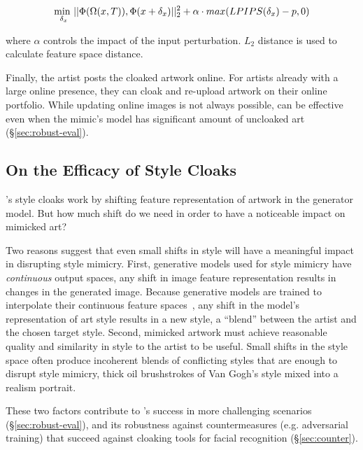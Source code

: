 \vspace{-0.05in}
\begin{equation} \label{eq:optdetail} \vspace{-0.03in} 
 \underset{\delta_x}{\text{min }}||\Phi(\Omega(x, T)), \Phi(x + \delta_x) ||_2^2 + \alpha \cdot max(LPIPS(\delta_x)-p, 0) 
\end{equation}

\noindent where $\alpha$ controls the impact of the input perturbation. $L_2$
distance is used to calculate feature space distance.

 Finally, the artist posts the cloaked artwork
online. For artists already with a large online presence, they can cloak and
re-upload artwork on their online portfolio.
While updating online images is not always possible, 
\system{} can be effective even when the mimic's model has significant amount
of uncloaked art (\S\ref{sec:robust-eval}).

\secspace
\subsection{On the Efficacy of Style Cloaks}
\label{sec:cloak-effect}

\system's style cloaks work by shifting feature representation of artwork in
the generator model. But how much shift do we need in order to have a
noticeable impact on mimicked art?


Two reasons suggest that even small shifts in style will have a meaningful
impact in disrupting style mimicry. First, generative models used for style
mimicry have {\em continuous} output spaces, \ie any shift in image feature
representation results in changes in the generated image.  Because generative
models are trained to interpolate their continuous feature
spaces~\cite{white2016sampling,upchurch2017deep}, any shift in the model's
representation of art style results in a new style, a ``blend'' between the
artist and the chosen target style.  
Second, mimicked artwork must achieve reasonable quality and similarity in
style to the artist to be useful. Small shifts in the style space often
produce incoherent blends of conflicting styles that are enough to disrupt
style mimicry, \eg thick oil brushstrokes of Van Gogh's style mixed into a realism portrait.

These two factors contribute to \system{}'s success in more challenging
scenarios (\S\ref{sec:robust-eval}), and its robustness against
countermeasures (e.g. adversarial training) that succeed against cloaking
tools for facial recognition (\S\ref{sec:counter}).

